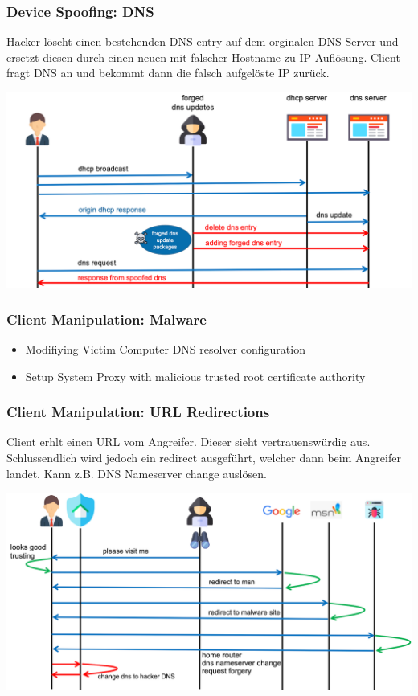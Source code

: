 \subsubsection{Device Spoofing: DNS}
Hacker löscht einen bestehenden DNS entry auf dem orginalen DNS Server und ersetzt diesen durch einen neuen mit falscher Hostname zu IP Auflösung. Client fragt DNS an und bekommt dann die falsch aufgelöste IP zurück.
\begin{center}
    \vspace{-8pt}
    \includegraphics[width=1.0\linewidth]{./img/09-mitm/dns}
    \vspace{-8pt}
\end{center}

\subsubsection{Client Manipulation: Malware}
\begin{itemize}
    \item Modifiying Victim Computer DNS resolver configuration
    \item Setup System Proxy with malicious trusted root certificate authority
\end{itemize}

\subsubsection{Client Manipulation: URL Redirections}
Client erhlt einen URL vom Angreifer. Dieser sieht vertrauenswürdig aus. Schlussendlich wird jedoch ein redirect ausgeführt, welcher dann beim Angreifer landet. Kann z.B. DNS Nameserver change auslösen.
\begin{center}
    \vspace{-8pt}
    \includegraphics[width=1.0\linewidth]{./img/09-mitm/redirecting}
    \vspace{-8pt}
\end{center}

